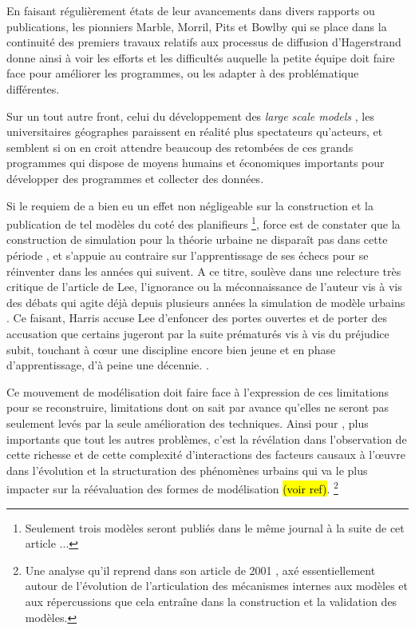 En faisant régulièrement états de leur avancements dans divers rapports ou publications, les pionniers Marble, Morril, Pits et Bowlby \autocite{Pitts1963} qui se place dans la continuité des premiers travaux relatifs aux processus de diffusion d'Hagerstrand \autocite{Hagerstrand1953, Hagerstrand1967a} donne ainsi à voir les efforts et les difficultés auquelle la petite équipe doit faire face pour améliorer les programmes, ou les adapter à des problématique différentes.

Sur un tout autre front, celui du développement des \textit{large scale models} \autocite[8]{Batty1976} \autocite[11]{Batty1994}, les universitaires géographes paraissent en réalité plus spectateurs qu'acteurs, et semblent si on en croit \textcite{Haggett1969} attendre beaucoup des retombées de ces grands programmes qui dispose de moyens humains et économiques importants pour développer des programmes et collecter des données.

Si le requiem de \textcite{Lee1973} a bien eu un effet non négligeable sur la construction et la publication de tel modèles du coté des planifieurs \footnote{Seulement trois modèles seront publiés dans le même journal à la suite de cet article ...}, force est de constater que la construction de simulation pour la théorie urbaine ne disparaît pas dans cette période \autocite[11-12]{Batty1994}, et s'appuie au contraire sur l'apprentissage de ses échecs pour se réinventer dans les années qui suivent. A ce titre, \textcite{Harris1994} soulève dans une relecture très critique de l'article de Lee, l'ignorance ou la méconnaissance de l'auteur vis à vis des débats qui agite déjà depuis plusieurs années la simulation de modèle urbains \autocite{Batty1971, Wilson1970, Orcutt1957, Harris1968}. Ce faisant, Harris accuse Lee d'enfoncer des portes ouvertes et de porter des accusation que certains jugeront par la suite prématurés vis à vis du préjudice subit, touchant à cœur une discipline encore bien jeune et en phase d'apprentissage, d'à peine une décennie. \autocite[p11]{Batty1994}.

Ce mouvement de modélisation doit faire face à l'expression de ces limitations pour se reconstruire, limitations dont on sait par avance qu'elles ne seront pas seulement levés par la seule amélioration des techniques. Ainsi pour \autocite[11]{Batty1976}, plus importants que tout les autres problèmes, c'est la révélation dans l'observation de cette richesse et de cette complexité d'interactions des facteurs causaux à l’œuvre dans l'évolution et la structuration des phénomènes urbains qui va le plus impacter sur la réévaluation des formes de modélisation \hl{(voir ref)}. \footnote{Une analyse qu'il reprend dans son article de 2001 \autocite{Batty2001}, axé essentiellement autour de l'évolution de l'articulation des mécanismes internes aux modèles et aux répercussions que cela entraîne dans la construction et la validation des modèles. }

